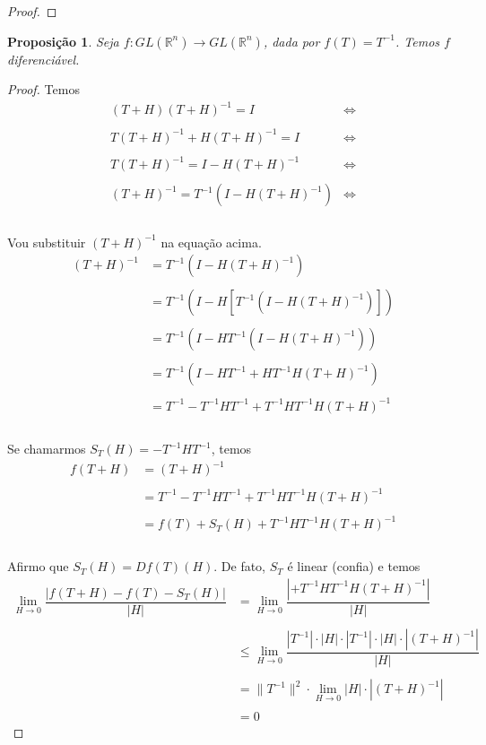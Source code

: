 \documentclass{article}
\newtheorem{prop}{Proposição}[section]
\theoremstyle{theorem}
\theoremstyle{lemma}
\theoremstyle{definition}
\theoremstyle{remark}
\begin{document}
\begin{proof}
\end{proof}
\begin{prop}
Seja $f: GL(\mathbb{R}^n) \to GL(\mathbb{R}^n)$, dada por $f(T) = T^{-1}$.  Temos $f$ diferenciável.
\end{prop}
	\begin{proof}
	Temos  \begin{align*}
(T+H)(T+H)^{-1} = I &\iff \\~\\
T(T+H)^{-1} +H(T+H)^{-1} = I &\iff \\~\\
T(T+H)^{-1} = I -H(T+H)^{-1} &\iff \\~\\
(T+H)^{-1} = T^{-1}  ( I -H(T+H)^{-1} )  &\iff \\~\\
\end{align*}

Vou substituir $(T+H)^{-1}$ na equação acima.\begin{align*}
(T+H)^{-1} &= T^{-1}  ( I -H(T+H)^{-1} )   \\~\\
 &= T^{-1}  ( I -H \left[T^{-1}  ( I -H(T+H)^{-1} )\right])   \\~\\
 &= T^{-1}  ( I -H T^{-1}  ( I -H(T+H)^{-1} ))   \\~\\
 &= T^{-1}  ( I -H T^{-1}   +HT^{-1}H(T+H)^{-1} )   \\~\\
 &= T^{-1}   -T^{-1}H T^{-1}   +T^{-1}HT^{-1}H(T+H)^{-1}    \\~\\
\end{align*}

Se chamarmos $S_T(H) = -T^{-1}HT^{-1}$, temos \begin{align*}
f(T+H) &= (T+H)^{-1}    \\~\\
 &= T^{-1}   -T^{-1}H T^{-1}   +T^{-1}HT^{-1}H(T+H)^{-1}    \\~\\
 &= f(T)   +S_T(H)   +T^{-1}HT^{-1}H(T+H)^{-1}    \\~\\
\end{align*}

Afirmo que $S_T(H) = Df(T)(H)$. De fato, $S_T$ é linear (confia) e temos \begin{align*}
\displaystyle\lim_{H\to 0} \dfrac{| f(T+H) - f(T) - S_T(H)|}{|H|} &= \displaystyle\lim_{H\to 0}\dfrac{| +T^{-1}HT^{-1}H(T+H)^{-1} |}{|H|} \\~\\
&\leq \displaystyle\lim_{H \to 0}\dfrac{|T^{-1}|\cdot |H|\cdot |T^{-1}| \cdot |H| \cdot |(T+H)^{-1}|}{|H|} \\~\\
&= \|T^{-1}\|^2\cdot \displaystyle\lim_{H \to 0}|H| \cdot |(T+H)^{-1}| \\~\\
&=0
\end{align*}
	\end{proof}
\end{document}

